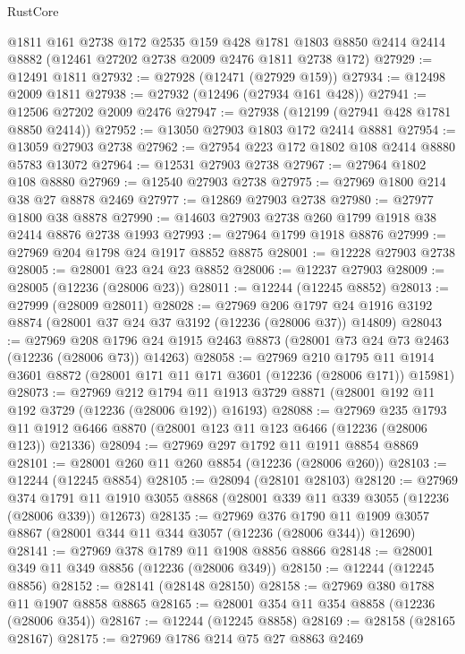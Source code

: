 \begin{lexlean}{RustCore}
\begin{coremodule}
    @1811
    @161
    @2738
    @172
    @2535
    @159
    @428
    @1781
    @1803
    @8850
    @2414
    @2414
    @8882
    (@12461 @27202 @2738 @2009 @2476 @1811 @2738 @172)
@27929 := @12491 @1811
@27932 := @27928 (@12471 (@27929 @159))
@27934 := @12498 @2009 @1811
@27938 := @27932 (@12496 (@27934 @161 @428))
@27941 := @12506 @27202 @2009 @2476
@27947 := @27938 (@12199 (@27941 @428 @1781 @8850 @2414))
@27952 := @13050 @27903 @1803 @172 @2414 @8881
@27954 := @13059 @27903 @2738
@27962 := @27954 @223 @172 @1802 @108 @2414 @8880 @5783 @13072
@27964 := @12531 @27903 @2738
@27967 := @27964 @1802 @108 @8880
@27969 := @12540 @27903 @2738
@27975 := @27969 @1800 @214 @38 @27 @8878 @2469
@27977 := @12869 @27903 @2738
@27980 := @27977 @1800 @38 @8878
@27990 := @14603 @27903 @2738 @260 @1799 @1918 @38 @2414 @8876 @2738 @1993
@27993 := @27964 @1799 @1918 @8876
@27999 := @27969 @204 @1798 @24 @1917 @8852 @8875
@28001 := @12228 @27903 @2738
@28005 := @28001 @23 @24 @23 @8852
@28006 := @12237 @27903
@28009 := @28005 (@12236 (@28006 @23))
@28011 := @12244 (@12245 @8852)
@28013 := @27999 (@28009 @28011)
@28028 := @27969
    @206
    @1797
    @24
    @1916
    @3192
    @8874
    (@28001 @37 @24 @37 @3192 (@12236 (@28006 @37)) @14809)
@28043 := @27969
    @208
    @1796
    @24
    @1915
    @2463
    @8873
    (@28001 @73 @24 @73 @2463 (@12236 (@28006 @73)) @14263)
@28058 := @27969
    @210
    @1795
    @11
    @1914
    @3601
    @8872
    (@28001 @171 @11 @171 @3601 (@12236 (@28006 @171)) @15981)
@28073 := @27969
    @212
    @1794
    @11
    @1913
    @3729
    @8871
    (@28001 @192 @11 @192 @3729 (@12236 (@28006 @192)) @16193)
@28088 := @27969
    @235
    @1793
    @11
    @1912
    @6466
    @8870
    (@28001 @123 @11 @123 @6466 (@12236 (@28006 @123)) @21336)
@28094 := @27969 @297 @1792 @11 @1911 @8854 @8869
@28101 := @28001 @260 @11 @260 @8854 (@12236 (@28006 @260))
@28103 := @12244 (@12245 @8854)
@28105 := @28094 (@28101 @28103)
@28120 := @27969
    @374
    @1791
    @11
    @1910
    @3055
    @8868
    (@28001 @339 @11 @339 @3055 (@12236 (@28006 @339)) @12673)
@28135 := @27969
    @376
    @1790
    @11
    @1909
    @3057
    @8867
    (@28001 @344 @11 @344 @3057 (@12236 (@28006 @344)) @12690)
@28141 := @27969 @378 @1789 @11 @1908 @8856 @8866
@28148 := @28001 @349 @11 @349 @8856 (@12236 (@28006 @349))
@28150 := @12244 (@12245 @8856)
@28152 := @28141 (@28148 @28150)
@28158 := @27969 @380 @1788 @11 @1907 @8858 @8865
@28165 := @28001 @354 @11 @354 @8858 (@12236 (@28006 @354))
@28167 := @12244 (@12245 @8858)
@28169 := @28158 (@28165 @28167)
@28175 := @27969 @1786 @214 @75 @27 @8863 @2469

\end{coremodule}
\end{lexlean}
